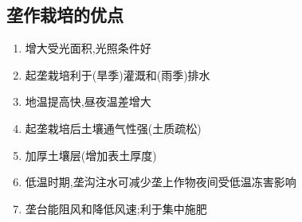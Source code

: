 \documentclass[a4paper]{article}
\begin{document}
    \subsection{垄作栽培的优点}
    \begin{enumerate}
        \item 增大受光面积,光照条件好
        \item 起垄栽培利于(旱季)灌溉和(雨季)排水 %
        \item 地温提高快,昼夜温差增大
        \item 起垄栽培后土壤通气性强(土质疏松)
        \item 加厚土壤层(增加表土厚度)
        \item 低温时期,垄沟注水可减少垄上作物夜间受低温冻害影响
        \item 垄台能阻风和降低风速;利于集中施肥
    \end{enumerate}
\end{document}
